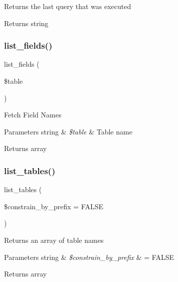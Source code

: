 Returns the last query that was executed

\begin{DoxyReturn}{Returns}
string 
\end{DoxyReturn}
\mbox{\label{class_c_i___d_b__driver_aef08cd376b16b24608100ca0e3f2f85b}} 
\subsubsection{\texorpdfstring{list\+\_\+fields()}{list\_fields()}}
{\footnotesize\ttfamily list\+\_\+fields (\begin{DoxyParamCaption}\item[{}]{\$table }\end{DoxyParamCaption})}

Fetch Field Names


\begin{DoxyParams}[1]{Parameters}
string & {\em \$table} & Table name \\
\hline
\end{DoxyParams}
\begin{DoxyReturn}{Returns}
array 
\end{DoxyReturn}
\mbox{\label{class_c_i___d_b__driver_accef90659bed312aba1c3df80620b402}} 
\subsubsection{\texorpdfstring{list\+\_\+tables()}{list\_tables()}}
{\footnotesize\ttfamily list\+\_\+tables (\begin{DoxyParamCaption}\item[{}]{\$constrain\+\_\+by\+\_\+prefix = {\ttfamily FALSE} }\end{DoxyParamCaption})}

Returns an array of table names


\begin{DoxyParams}[1]{Parameters}
string & {\em \$constrain\+\_\+by\+\_\+prefix} & = F\+A\+L\+SE \\
\hline
\end{DoxyParams}
\begin{DoxyReturn}{Returns}
array 
\end{DoxyReturn}
\mbox{\label{class_c_i___d_b__driver_ad69bddb2ba31b27415484b3da4213ba8}} 
